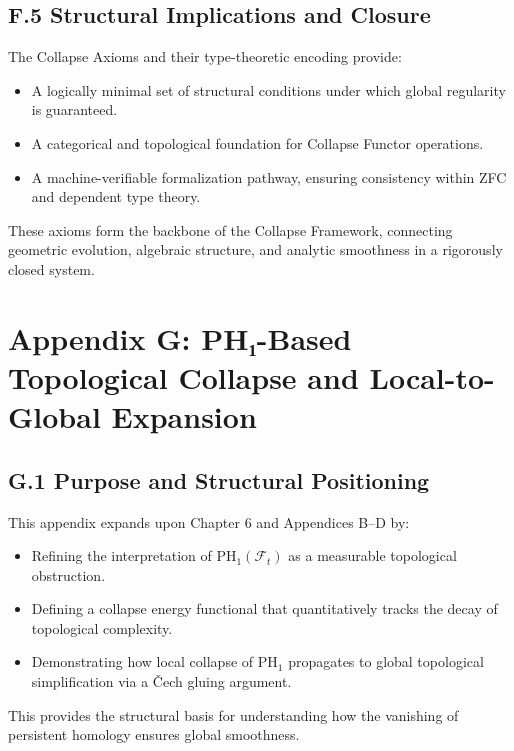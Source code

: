 \documentclass[11pt]{article}
\begin{document}
\subsection*{F.5 Structural Implications and Closure}

The Collapse Axioms and their type-theoretic encoding provide:

\begin{itemize}
  \item A logically minimal set of structural conditions under which global regularity is guaranteed.
  \item A categorical and topological foundation for Collapse Functor operations.
  \item A machine-verifiable formalization pathway, ensuring consistency within ZFC and dependent type theory.
\end{itemize}

These axioms form the backbone of the Collapse Framework, connecting geometric evolution, algebraic structure, and analytic smoothness in a rigorously closed system.



\section*{Appendix G: PH₁-Based Topological Collapse and Local-to-Global Expansion}

\subsection*{G.1 Purpose and Structural Positioning}

This appendix expands upon Chapter 6 and Appendices B–D by:

\begin{itemize}
  \item Refining the interpretation of \( \mathrm{PH}_1(\mathcal{F}_t) \) as a measurable topological obstruction.
  \item Defining a collapse energy functional that quantitatively tracks the decay of topological complexity.
  \item Demonstrating how local collapse of \( \mathrm{PH}_1 \) propagates to global topological simplification via a Čech gluing argument.
\end{itemize}

This provides the structural basis for understanding how the vanishing of persistent homology ensures global smoothness.
\end{document}
